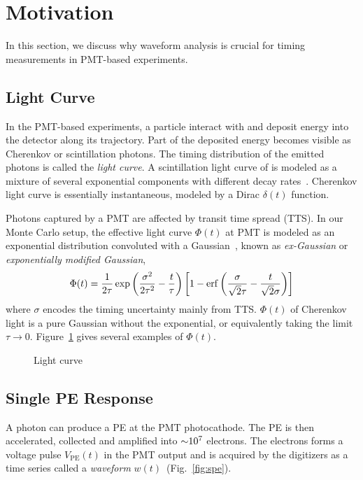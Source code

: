 \section{Motivation} %
\label{sec:toyMC}

In this section, we discuss why waveform analysis is crucial for timing measurements in PMT-based experiments. 

\subsection{Light Curve}
In the PMT-based experiments, a particle interact with and deposit energy into the detector along its trajectory. Part of the deposited energy becomes visible as Cherenkov or scintillation photons.  The timing distribution of the emitted photons is called the \textit{light curve}.  A scintillation light curve of is modeled as a mixture of several exponential components with different decay rates~\cite{ludhova_particle_2020}.  Cherenkov light curve is essentially instantaneous, modeled by a Dirac $\delta(t)$ function.

Photons captured by a PMT are affected by transit time spread (TTS).  In our Monte Carlo setup, the effective light curve $\Phi(t)$ at PMT is modeled as an exponential distribution convoluted with a Gaussian~\cite{li_separation_2016}, known as \textit{ex-Gaussian} or \textit{exponentially modified Gaussian},
\begin{align}
    \Phi(t) = \frac{1}{2\tau} \exp\left(\frac{\sigma^2}{2\tau^2}-\frac{t}{\tau}\right) \left[1 - \operatorname{erf}\left( \frac{\sigma}{\sqrt{2}\tau} - \frac{t}{\sqrt{2}\sigma} \right)\right]
    \label{eq:time-pro}
\end{align}
where $\sigma$ encodes the timing uncertainty mainly from TTS.  $\Phi(t)$ of Cherenkov light is a pure Gaussian without the exponential, or equivalently taking the limit $\tau \rightarrow 0$.  Figure~\ref{fig:time-pro} gives several examples of $\Phi(t)$.

\begin{figure}
  \centering
  \resizebox{0.5\textwidth}{!}{}
  \caption{\label{fig:time-pro} Light curve}
\end{figure}

\subsection{Single PE Response}
A photon can produce a PE at the PMT photocathode.  The PE is then accelerated, collected and amplified into $\num[retain-unity-mantissa=false]{\sim 1e7}$ electrons.  The electrons forms a voltage pulse $V_\mathrm{PE}(t)$ in the PMT output and is acquired by the digitizers as a time series called a \textit{waveform} $w(t)$~(Fig.~\ref{fig:spe}).

